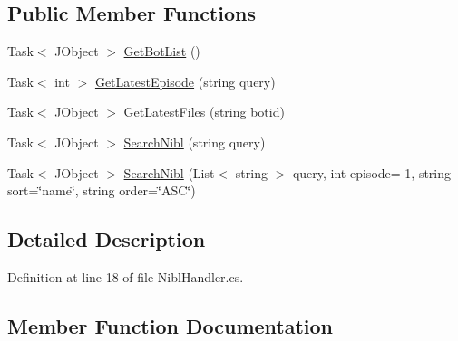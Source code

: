\subsection*{Public Member Functions}
\begin{DoxyCompactItemize}
\item 
Task$<$ J\+Object $>$ \mbox{\hyperlink{interface_little_weeb_library_1_1_handlers_1_1_i_nibl_handler_ae0847d190828d9d373650626f92e83ec}{Get\+Bot\+List}} ()
\item 
Task$<$ int $>$ \mbox{\hyperlink{interface_little_weeb_library_1_1_handlers_1_1_i_nibl_handler_a7e3c7dc7ba9a01c39d125dc0a759d606}{Get\+Latest\+Episode}} (string query)
\item 
Task$<$ J\+Object $>$ \mbox{\hyperlink{interface_little_weeb_library_1_1_handlers_1_1_i_nibl_handler_a744548c45993c925a492744f1fb747e9}{Get\+Latest\+Files}} (string botid)
\item 
Task$<$ J\+Object $>$ \mbox{\hyperlink{interface_little_weeb_library_1_1_handlers_1_1_i_nibl_handler_a751ab95fe78f072abef69d89e5557ad1}{Search\+Nibl}} (string query)
\item 
Task$<$ J\+Object $>$ \mbox{\hyperlink{interface_little_weeb_library_1_1_handlers_1_1_i_nibl_handler_aea34d508a803bf76f119e95b6e9e9cf0}{Search\+Nibl}} (List$<$ string $>$ query, int episode=-\/1, string sort=\char`\"{}name\char`\"{}, string order=\char`\"{}A\+SC\char`\"{})
\end{DoxyCompactItemize}


\subsection{Detailed Description}


Definition at line 18 of file Nibl\+Handler.\+cs.



\subsection{Member Function Documentation}
\mbox{\label{interface_little_weeb_library_1_1_handlers_1_1_i_nibl_handler_ae0847d190828d9d373650626f92e83ec}} 
